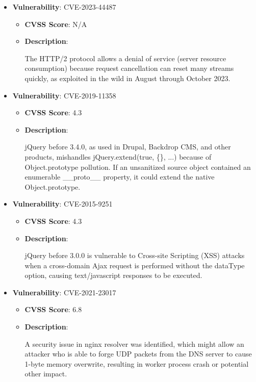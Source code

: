 \documentclass{article}
\begin{document}
\begin{itemize}
    
        \item \textbf{Vulnerability}: CVE-2023-44487
        \begin{itemize}
            \item \textbf{CVSS Score}:  N/A 
            \item \textbf{Description}:
            \parbox[t]{0.9\linewidth}{
                \ttfamily The HTTP/2 protocol allows a denial of service (server resource consumption) because request cancellation can reset many streams quickly, as exploited in the wild in August through October 2023.
            }
        \end{itemize}
    
        \item \textbf{Vulnerability}: CVE-2019-11358
        \begin{itemize}
            \item \textbf{CVSS Score}:  4.3 
            \item \textbf{Description}:
            \parbox[t]{0.9\linewidth}{
                \ttfamily jQuery before 3.4.0, as used in Drupal, Backdrop CMS, and other products, mishandles jQuery.extend(true, \{\}, ...) because of Object.prototype pollution. If an unsanitized source object contained an enumerable \_\_proto\_\_ property, it could extend the native Object.prototype.
            }
        \end{itemize}
    
        \item \textbf{Vulnerability}: CVE-2015-9251
        \begin{itemize}
            \item \textbf{CVSS Score}:  4.3 
            \item \textbf{Description}:
            \parbox[t]{0.9\linewidth}{
                \ttfamily jQuery before 3.0.0 is vulnerable to Cross-site Scripting (XSS) attacks when a cross-domain Ajax request is performed without the dataType option, causing text/javascript responses to be executed.
            }
        \end{itemize}
    
        \item \textbf{Vulnerability}: CVE-2021-23017
        \begin{itemize}
            \item \textbf{CVSS Score}:  6.8 
            \item \textbf{Description}:
            \parbox[t]{0.9\linewidth}{
                \ttfamily A security issue in nginx resolver was identified, which might allow an attacker who is able to forge UDP packets from the DNS server to cause 1-byte memory overwrite, resulting in worker process crash or potential other impact.
            }
        \end{itemize}
    

\end{itemize}
\end{document}
